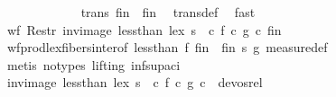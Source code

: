 \begin{isabellebody}
\ \ \ \ \isamarkupfalse%
\isanewline
\ \ \isamarkupfalse%
\isanewline
\ \ \isamarkupfalse%
\ \isamarkupfalse%
\ {\isachardoublequoteopen}trans\ {\isacharparenleft}{\kern0pt}{\isacharquery}{\kern0pt}fin\ {\isasymtimes}\ {\isacharquery}{\kern0pt}fin{\isacharparenright}{\kern0pt}{\isachardoublequoteclose}\ \isamarkupfalse%
\ trans{\isacharunderscore}{\kern0pt}def\ \isamarkupfalse%
\ fast\isanewline
\ \ \isamarkupfalse%
\ \isamarkupfalse%
\ {\isachardoublequoteopen}wf\ {\isacharparenleft}{\kern0pt}Restr\ {\isacharparenleft}{\kern0pt}inv{\isacharunderscore}{\kern0pt}image\ {\isacharparenleft}{\kern0pt}less{\isacharunderscore}{\kern0pt}than\ {\isacharless}{\kern0pt}{\isacharasterisk}{\kern0pt}lex{\isacharasterisk}{\kern0pt}{\isachargreater}{\kern0pt}\ s{\isacharparenright}{\kern0pt}\ {\isacharparenleft}{\kern0pt}{\isasymlambda}\ c{\isachardot}{\kern0pt}\ {\isacharparenleft}{\kern0pt}f\ c{\isacharcomma}{\kern0pt}\ g\ c{\isacharparenright}{\kern0pt}{\isacharparenright}{\kern0pt}{\isacharparenright}{\kern0pt}\ {\isacharquery}{\kern0pt}fin{\isacharparenright}{\kern0pt}{\isachardoublequoteclose}\ \isanewline
\ \ \ \ \isamarkupfalse%
\ wf{\isacharunderscore}{\kern0pt}prod{\isacharunderscore}{\kern0pt}lex{\isacharunderscore}{\kern0pt}fibers{\isacharunderscore}{\kern0pt}inter{\isacharbrackleft}{\kern0pt}of\ {\isachardoublequoteopen}less{\isacharunderscore}{\kern0pt}than{\isachardoublequoteclose}\ {\isachardoublequoteopen}f{\isachardoublequoteclose}\ {\isachardoublequoteopen}{\isacharquery}{\kern0pt}fin\ {\isasymtimes}\ {\isacharquery}{\kern0pt}fin{\isachardoublequoteclose}\ {\isachardoublequoteopen}s{\isachardoublequoteclose}\ {\isachardoublequoteopen}g{\isachardoublequoteclose}{\isacharbrackright}{\kern0pt}\ measure{\isacharunderscore}{\kern0pt}def\isanewline
\ \ \ \ \isamarkupfalse%
\ {\isacharparenleft}{\kern0pt}metis\ {\isacharparenleft}{\kern0pt}no{\isacharunderscore}{\kern0pt}types{\isacharcomma}{\kern0pt}\ lifting{\isacharparenright}{\kern0pt}\ inf{\isacharunderscore}{\kern0pt}sup{\isacharunderscore}{\kern0pt}aci{\isacharparenleft}{\kern0pt}{}{\isacharparenright}{\kern0pt}{\isacharparenright}{\kern0pt}\isanewline
\ \ \isamarkupfalse%
\ \isamarkupfalse%
\ {\isachardoublequoteopen}{\isacharparenleft}{\kern0pt}inv{\isacharunderscore}{\kern0pt}image\ {\isacharparenleft}{\kern0pt}less{\isacharunderscore}{\kern0pt}than\ {\isacharless}{\kern0pt}{\isacharasterisk}{\kern0pt}lex{\isacharasterisk}{\kern0pt}{\isachargreater}{\kern0pt}\ s{\isacharparenright}{\kern0pt}\ {\isacharparenleft}{\kern0pt}{\isasymlambda}\ c{\isachardot}{\kern0pt}\ {\isacharparenleft}{\kern0pt}f\ c{\isacharcomma}{\kern0pt}\ g\ c{\isacharparenright}{\kern0pt}{\isacharparenright}{\kern0pt}{\isacharparenright}{\kern0pt}\ {\isacharequal}{\kern0pt}\ devos{\isacharunderscore}{\kern0pt}rel{\isachardoublequoteclose}\isanewline

\end{isabellebody}
